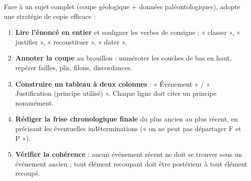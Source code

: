 \documentclass[11pt]{article}
\begin{document}
\begin{methode}
Face à un sujet complet (coupe géologique + données paléontologiques), adopte une stratégie de copie efficace :
\begin{enumerate}
\item \textbf{Lire l'énoncé en entier} et souligner les verbes de consigne : « classer », « justifier », « reconstituer », « dater ».
\item \textbf{Annoter la coupe} au brouillon : numéroter les couches de bas en haut, repérer failles, plis, filons, discordances.
\item \textbf{Construire un tableau à deux colonnes} : « Événement » / « Justification (principe utilisé) ». Chaque ligne doit citer un principe nommément.
\item \textbf{Rédiger la frise chronologique finale} du plus ancien au plus récent, en précisant les éventuelles indéterminations (« on ne peut pas départager F et P »).
\item \textbf{Vérifier la cohérence} : aucun événement récent ne doit se trouver sous un événement ancien ; tout élément recoupant doit être postérieur à tout élément recoupé.
\end{enumerate}
\end{methode}
\end{document}
